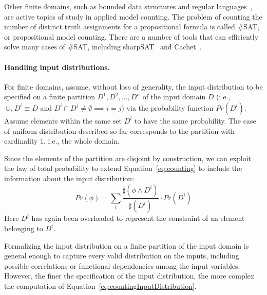 

Other finite domains, such as bounded data structures \cite{Filieri2015} and regular languages~\cite{Luu2014,Aydin2015}, are active topics of study in applied model counting.
The problem of counting the number of distinct truth assignments for
a propositional formula is called \#SAT, or propositional model counting.
There are a number of tools that can efficiently solve many cases of
\#SAT, including sharpSAT~\cite{thurley2006sharpsat} and Cachet~\cite{sang2005heuristics}.

\paragraph{Handling input distributions.} 
For finite domains, assume, without loss of generality, the input distribution to be specified on a finite partition $D^1, D^2, \dots, D^n$ of the input domain $D$ (i.e., $\cup_i D^i \equiv D$ and $D^i \cap D^j \neq \emptyset \implies i=j$) via the probability function $Pr(D^i)$. Assume elements within the same set $D^i$ to have the same probability. The case of uniform distribution described so far corresponds to the partition with cardinality 1, i.e., the whole domain.
 
Since the elements of the partition are disjoint by construction, we can exploit the law of total probability to extend Equation~\eqref{eq:counting} to include the information about the input distribution:
%
\begin{equation}\label{eq:countingInputDistribution}
	Pr(\phi) = \sum_i \frac{\sharp(\phi \land D^i)}{\sharp(D^i)} \cdot Pr(D^i)
\end{equation}
%
\noindent Here $D^i$ has again been overloaded to represent the constraint of an element belonging to $D^i$.

Formalizing the input distribution on a finite partition of the input domain is general enough to capture every valid distribution on the inputs, including possible correlations or functional dependencies among the input variables. However, the finer the specification of the input distribution, the more complex the computation of Equation~\eqref{eq:countingInputDistribution}.

